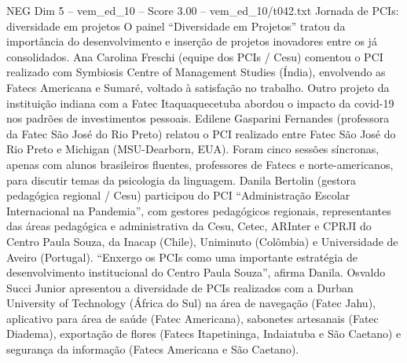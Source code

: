 \begin{textsample}{NEG Dim 5 – vem\_ed\_10 – Score 3.00 – vem\_ed\_10/t042.txt}  \label{ex:f5_neg_041}
Jornada de PCIs: diversidade em projetos O painel “Diversidade em Projetos” tratou da importância do desenvolvimento e inserção de projetos inovadores entre os já consolidados.
Ana Carolina Freschi (equipe dos PCIs / Cesu) comentou o PCI realizado com Symbiosis Centre of Management Studies (Índia), envolvendo as Fatecs Americana e Sumaré, voltado à satisfação no trabalho.
Outro projeto da instituição indiana com a Fatec Itaquaquecetuba abordou o impacto da covid-19 nos padrões de investimentos pessoais.
Edilene Gasparini Fernandes (professora da Fatec São José do Rio Preto) relatou o PCI realizado entre Fatec São José do Rio Preto e Michigan (MSU-Dearborn, EUA).
Foram cinco sessões síncronas, apenas com alunos brasileiros fluentes, professores de Fatecs e norte-americanos, para discutir temas da psicologia da linguagem.
Danila Bertolin (gestora pedagógica regional / Cesu) participou do PCI “Administração Escolar Internacional na Pandemia”, com gestores pedagógicos regionais, representantes das áreas pedagógica e administrativa da Cesu, Cetec, ARInter e CPRJI do Centro Paula Souza, da Inacap (Chile), Uniminuto (Colômbia) e Universidade de Aveiro (Portugal). “Enxergo os PCIs como uma importante estratégia de desenvolvimento institucional do Centro Paula Souza”, afirma Danila.
Osvaldo Succi Junior apresentou a diversidade de PCIs realizados com a Durban University of Technology (África do Sul) na área de navegação (Fatec Jahu), aplicativo para área de saúde (Fatec Americana), sabonetes artesanais (Fatec Diadema), exportação de flores (Fatecs Itapetininga, Indaiatuba e São Caetano) e segurança da informação (Fatecs Americana e São Caetano).

\end{textsample}
